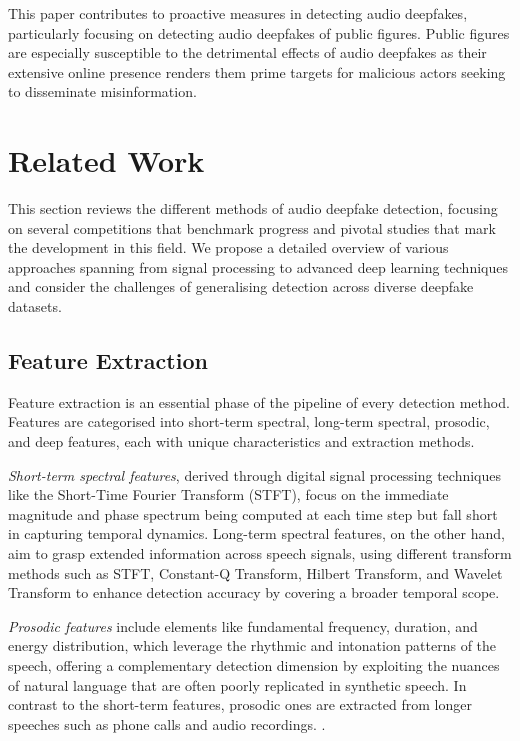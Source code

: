 \documentclass{Interspeech}
\begin{document}
This paper contributes to proactive measures in detecting audio deepfakes,
particularly focusing on detecting audio deepfakes of public figures. Public
figures are especially susceptible to the detrimental effects of audio
deepfakes as their extensive online presence renders them prime targets for
malicious actors seeking to disseminate misinformation.

\section{Related Work}
\label{sec:related_work}

This section reviews the different methods of audio deepfake detection,
focusing on several competitions that benchmark progress and pivotal studies
that mark the development in this field. We propose a detailed overview of
various approaches spanning from signal processing to advanced deep learning
techniques and consider the challenges of generalising detection across diverse
deepfake datasets.

\subsection{Feature Extraction}

Feature extraction is an essential phase of the pipeline of every detection
method. Features are categorised into short-term spectral, long-term spectral,
prosodic, and deep features, each with unique characteristics and extraction
methods.

\textit{Short-term spectral features}, derived through digital signal processing techniques like the Short-Time Fourier Transform (STFT), focus on the immediate magnitude and phase spectrum being computed at each time step \cite{tian2016spoofing} but fall short in capturing temporal dynamics. Long-term spectral features, on the other hand, aim to grasp extended information across speech signals, using different transform methods such as STFT, Constant-Q Transform, Hilbert Transform, and Wavelet Transform to enhance detection accuracy by covering a broader temporal scope.

\textit{Prosodic features} include elements like fundamental frequency, duration, and energy distribution, which leverage the rhythmic and intonation patterns of the speech, offering a complementary detection dimension by exploiting the nuances of natural language that are often poorly replicated in synthetic speech. In contrast to the short-term features, prosodic ones are extracted from longer speeches such as phone calls and audio recordings. \cite{kinnunen2010overview}.
\end{document}
